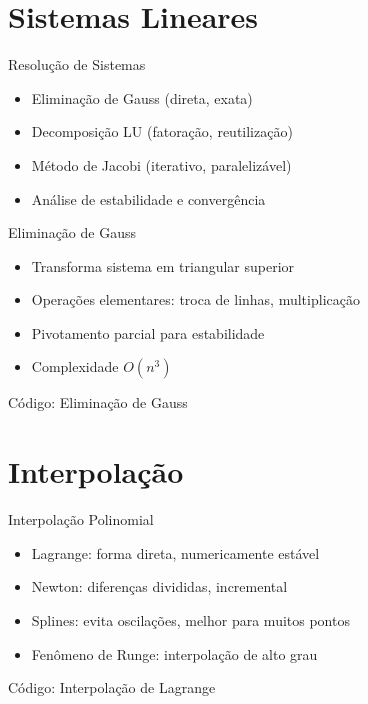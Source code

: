 \documentclass[11pt]{beamer}
\numberwithin{equation}{section}
\begin{document}
\section{Sistemas Lineares}
\begin{frame}{Resolução de Sistemas}
\begin{itemize}
\item Eliminação de Gauss (direta, exata)
\item Decomposição LU (fatoração, reutilização)
\item Método de Jacobi (iterativo, paralelizável)
\item Análise de estabilidade e convergência
\end{itemize}
\end{frame}

\begin{frame}{Eliminação de Gauss}
\begin{itemize}
\item Transforma sistema em triangular superior
\item Operações elementares: troca de linhas, multiplicação
\item Pivotamento parcial para estabilidade
\item Complexidade $O(n^3)$
\end{itemize}
\end{frame}

\begin{frame}{Código: Eliminação de Gauss}
\footnotesize
\end{frame}

\section{Interpolação}
\begin{frame}{Interpolação Polinomial}
\begin{itemize}
\item Lagrange: forma direta, numericamente estável
\item Newton: diferenças divididas, incremental
\item Splines: evita oscilações, melhor para muitos pontos
\item Fenômeno de Runge: interpolação de alto grau
\end{itemize}
\end{frame}

\begin{frame}{Código: Interpolação de Lagrange}
\footnotesize
\end{frame}
\end{document}
